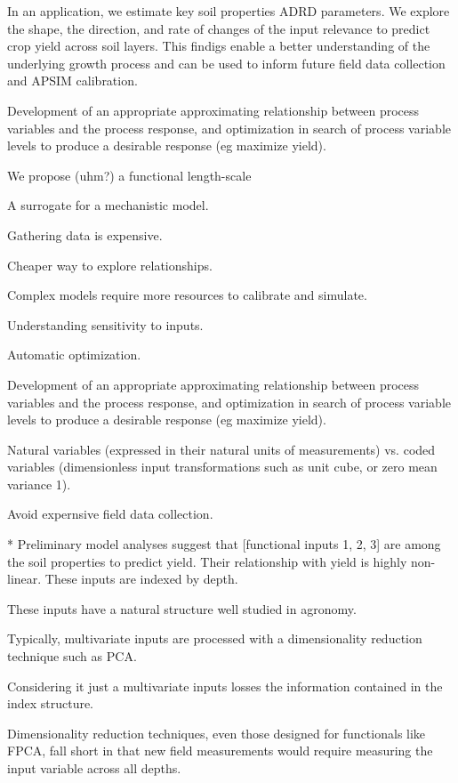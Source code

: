 In an application, we estimate key soil properties ADRD parameters. We
explore the shape, the direction, and rate of changes of the input
relevance to predict crop yield across soil layers. This findigs
enable a better understanding of the underlying growth process and can
be used to inform future field data collection and APSIM calibration.


Development of an appropriate approximating relationship between
process variables and the process response, and optimization in search
of process variable levels to produce a desirable response (eg
maximize yield).

We propose (uhm?) a functional length-scale

A surrogate for a mechanistic model.

Gathering data is expensive.

Cheaper way to explore relationships.

Complex models require more resources to calibrate and simulate.

Understanding sensitivity to inputs.

Automatic optimization.

Development of an appropriate approximating relationship between
process variables and the process response, and optimization in search
of process variable levels to produce a desirable response (eg
maximize yield).

Natural variables (expressed in their natural units of measurements)
vs. coded variables (dimensionless input transformations such as unit
cube, or zero mean variance 1).

Avoid expernsive field data collection.

* Preliminary model analyses suggest that [functional inputs 1, 2, 3]
are among the soil properties to predict yield. Their relationship
with yield is highly non-linear. These inputs are indexed by depth.

These inputs have a natural structure well studied in agronomy.

Typically, multivariate inputs are processed with a dimensionality
reduction technique such as PCA.

Considering it just a multivariate inputs losses the information
contained in the index structure.

Dimensionality reduction techniques,
even those designed for functionals like FPCA, fall short in that new
field measurements would require measuring the input variable across
all depths.

